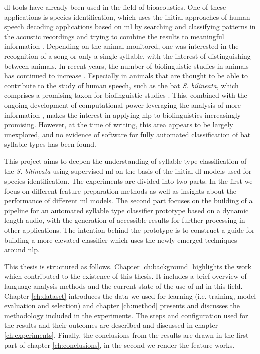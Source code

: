 \Gls{dl} tools have already been used in the field of bioacoustics. One of these applications is species identification, which uses the initial approaches of human speech decoding applications based on \gls{ml} by searching and classifying patterns in the acoustic recordings and trying to combine the results to meaningful information \cite{Stowell2019}.
Depending on the animal monitored, one was interested in the recognition of a song or only a single syllable, with the interest of distinguishing between animals.
In recent years, the number of biolinguistic studies in animals has continued to increase \cite{Vernes2020,Wirthlin2019ATrait}.
Especially in animals that are thought to be able to contribute to the study of human speech, such as the bat \emph{S. bilineata}, which comprises a promising taxon for biolinguistic studies \cite{Knornschild2014}.
This, combined with the ongoing development of computational power leveraging the analysis of more information \cite{Amodei2019}, makes the interest in applying \gls{nlp} to biolinguistics increasingly promising.
However, at the time of writing, this area appears to be largely unexplored, and no evidence of software for fully automated classification of bat syllable types has been found.


This project aims to deepen the understanding of syllable type classification of the \emph{S. bilineata} using supervised \gls{ml} on the basis of the initial \gls{dl} models used for species identification.
The experiments are divided into two parts. In the first we focus on different feature preparation methods as well as insights about the performance of different \gls{ml} models.
The second part focuses on the building of a pipeline for an automated syllable type classifier prototype based on a dynamic length audio, with the generation of accessible results for further processing in other applications.
The intention behind the prototype is to construct a guide for building a more elevated classifier which uses the newly emerged techniques around \gls{nlp}.

This thesis is structured as follows. Chapter \ref{ch:background} highlights the work which contributed to the existence of this thesis. It includes a brief overview of language analysis methods and the current state of the use of \gls{ml} in this field. Chapter \ref{ch:dataset} introduces the data we used for learning (i.e. training, model evaluation and selection) and chapter \ref{ch:method} presents and discusses the methodology included in the experiments. The steps and configuration used for the results and their outcomes are described and discussed in chapter \ref{ch:experiments}.
Finally, the conclusions from the results are drawn in the first part of chapter \ref{ch:conclusions}, in the second we render the feature works.
